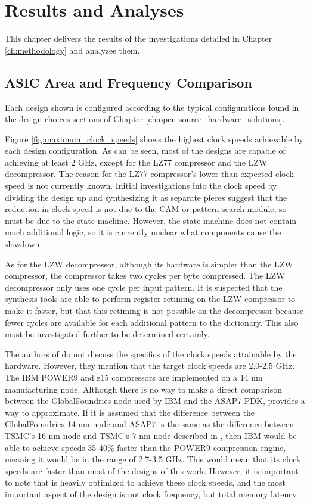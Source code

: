 \documentclass[doublespace,nopageskip]{VTthesis}
\begin{document}
\chapter{Results and Analyses} \label{ch:results}
This chapter delivers the results of the investigations detailed in Chapter \ref{ch:methodology} and analyzes them.

\section{ASIC Area and Frequency Comparison}\label{se:asic_area_and_frequency_comparison}
Each design shown is configured according to the typical configurations found in the design choices sections of Chapter \ref{ch:open-source_hardware_solutions}.

Figure \ref{fig:maximum_clock_speeds} shows the highest clock speeds achievable by each design configuration. As can be seen, most of the designs are capable of achieving at least 2 GHz, except for the LZ77 compressor and the LZW decompressor. The reason for the LZ77 compressor's lower than expected clock speed is not currently known. Initial investigations into the clock speed by dividing the design up and synthesizing it as separate pieces suggest that the reduction in clock speed is not due to the CAM or pattern search module, so must be due to the state machine. However, the state machine does not contain much additional logic, so it is currently unclear what components cause the slowdown.

As for the LZW decompressor, although its hardware is simpler than the LZW compressor, the compressor takes two cycles per byte compressed. The LZW decompressor only uses one cycle per input pattern. It is suspected that the synthesis tools are able to perform register retiming on the LZW compressor to make it faster, but that this retiming is not possible on the decompressor because fewer cycles are available for each additional pattern to the dictionary. This also must be investigated further to be determined certainly.

The authors of \cite{ibm} do not discuss the specifics of the clock speeds attainable by the hardware. However, they mention that the target clock speeds are 2.0-2.5 GHz. The IBM POWER9 and z15 compressors are implemented on a 14 nm manufacturing node. Although there is no way to make a direct comparison between the GlobalFoundries node used by IBM and the ASAP7 PDK, \cite{wikichip-manufacturing-conversion} provides a way to approximate. If it is assumed that the difference between the GlobalFoundries 14 nm node and ASAP7 is the same as the difference between TSMC's 16 nm node and TSMC's 7 nm node described in \cite{wikichip-manufacturing-conversion}, then IBM would be able to achieve speeds 35-40\% faster than the POWER9 compression engine, meaning it would be in the range of 2.7-3.5 GHz. This would mean that its clock speeds are faster than most of the designs of this work. However, it is important to note that \cite{ibm} is heavily optimized to achieve these clock speeds, and the most important aspect of the design is not clock frequency, but total memory latency.
\end{document}
